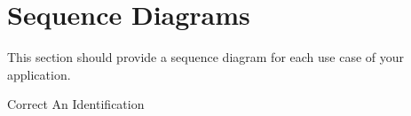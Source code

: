 \documentclass[]{article}
\begin{document}
\section{Sequence Diagrams}
\label{sec:sequence_diagrams}
This section should provide a sequence diagram for each use case of your application.
\\
\begin{center}
	Correct An Identification

\end{center}
\end{document}
